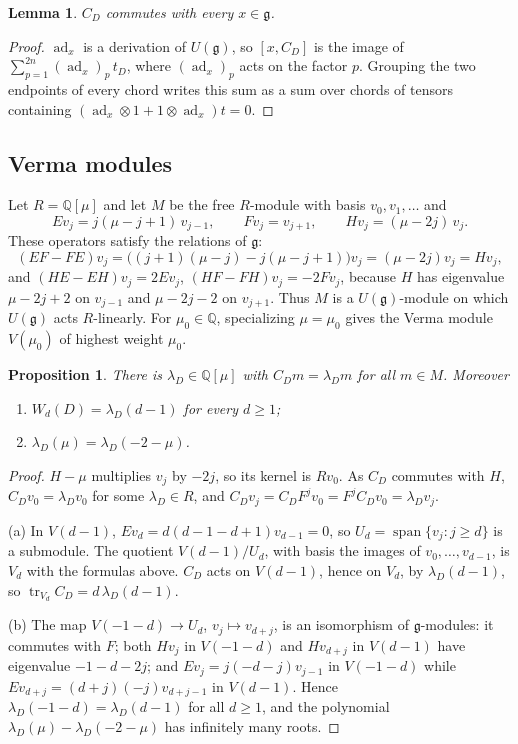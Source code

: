 \documentclass[preprint,12pt]{elsarticle}
\newtheorem{proposition}[theorem]{Proposition}
\newtheorem{lemma}[theorem]{Lemma}
\theoremstyle{definition}
\newcommand{\Q}{\mathbb{Q}}
\newcommand{\g}{\mathfrak{g}}
\newcommand{\Ue}{U(\g)}
\newcommand{\tr}{\operatorname{tr}}
\begin{document}
\begin{lemma}\label{lem:central}
$C_D$ commutes with every $x\in\g$.
\end{lemma}

\begin{proof}
$\operatorname{ad}_x$ is a derivation of $\Ue$, so $[x,C_D]$ is the image of $\sum_{p=1}^{2n}(\operatorname{ad}_x)_p\,t_D$, where $(\operatorname{ad}_x)_p$ acts on the factor $p$. Grouping the two endpoints of every chord writes this sum as a sum over chords of tensors containing $(\operatorname{ad}_x\otimes1+1\otimes\operatorname{ad}_x)t=0$.
\end{proof}

\subsection{Verma modules}
Let $R=\Q[\mu]$ and let $M$ be the free $R$-module with basis $v_0,v_1,\dots$ and
\begin{equation}\label{eq:verma}
Ev_j=j(\mu-j+1)\,v_{j-1},\qquad Fv_j=v_{j+1},\qquad Hv_j=(\mu-2j)\,v_j .
\end{equation}
These operators satisfy the relations of $\g$:
\[
(EF-FE)v_j=\bigl((j+1)(\mu-j)-j(\mu-j+1)\bigr)v_j=(\mu-2j)v_j=Hv_j,
\]
and $(HE-EH)v_j=2Ev_j$, $(HF-FH)v_j=-2Fv_j$, because $H$ has eigenvalue $\mu-2j+2$ on $v_{j-1}$ and $\mu-2j-2$ on $v_{j+1}$. Thus $M$ is a $\Ue$-module on which $\Ue$ acts $R$-linearly. For $\mu_0\in\Q$, specializing $\mu=\mu_0$ gives the Verma module $V(\mu_0)$ of highest weight $\mu_0$.

\begin{proposition}\label{prop:lambda}
There is $\lambda_D\in\Q[\mu]$ with $C_Dm=\lambda_Dm$ for all $m\in M$. Moreover
\begin{enumerate}
\item[(a)] $W_d(D)=\lambda_D(d-1)$ for every $d\ge1$;
\item[(b)] $\lambda_D(\mu)=\lambda_D(-2-\mu)$.
\end{enumerate}
\end{proposition}

\begin{proof}
$H-\mu$ multiplies $v_j$ by $-2j$, so its kernel is $Rv_0$. As $C_D$ commutes with $H$, $C_Dv_0=\lambda_Dv_0$ for some $\lambda_D\in R$, and $C_Dv_j=C_DF^jv_0=F^jC_Dv_0=\lambda_Dv_j$.

(a) In $V(d-1)$, $Ev_d=d(d-1-d+1)v_{d-1}=0$, so $U_d=\operatorname{span}\{v_j:j\ge d\}$ is a submodule. The quotient $V(d-1)/U_d$, with basis the images of $v_0,\dots,v_{d-1}$, is $V_d$ with the formulas above. $C_D$ acts on $V(d-1)$, hence on $V_d$, by $\lambda_D(d-1)$, so $\tr_{V_d}C_D=d\,\lambda_D(d-1)$.

(b) The map $V(-1-d)\to U_d$, $v_j\mapsto v_{d+j}$, is an isomorphism of $\g$-modules: it commutes with $F$; both $Hv_j$ in $V(-1-d)$ and $Hv_{d+j}$ in $V(d-1)$ have eigenvalue $-1-d-2j$; and $Ev_j=j(-d-j)v_{j-1}$ in $V(-1-d)$ while $Ev_{d+j}=(d+j)(-j)v_{d+j-1}$ in $V(d-1)$. Hence $\lambda_D(-1-d)=\lambda_D(d-1)$ for all $d\ge1$, and the polynomial $\lambda_D(\mu)-\lambda_D(-2-\mu)$ has infinitely many roots.
\end{proof}
\end{document}
